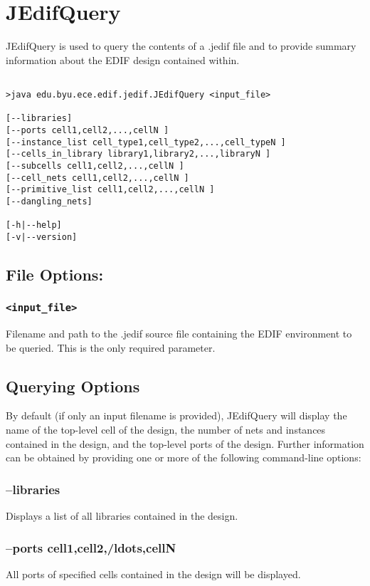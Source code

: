 \section{JEdifQuery}
JEdifQuery is used to query the contents of a .jedif file and to
provide summary information about the EDIF design contained within.
\begin{verbatim}

>java edu.byu.ece.edif.jedif.JEdifQuery <input_file>

[--libraries] 
[--ports cell1,cell2,...,cellN ] 
[--instance_list cell_type1,cell_type2,...,cell_typeN ]
[--cells_in_library library1,library2,...,libraryN ]
[--subcells cell1,cell2,...,cellN ] 
[--cell_nets cell1,cell2,...,cellN ]
[--primitive_list cell1,cell2,...,cellN ]
[--dangling_nets]

[-h|--help] 
[-v|--version]

\end{verbatim}

\subsection{File Options:}
\subsubsection{\texttt{<input\_file>}}
Filename and path to the .jedif source file containing the EDIF environment to be queried. This is the only required parameter.

\subsection{Querying Options}
  By default (if only an input filename is provided), JEdifQuery will
  display the name of the top-level cell of the design, the number of
  nets and instances contained in the design, and the top-level ports
  of the design. Further information can be obtained by providing one
  or more of the following command-line options:

  \subsubsection{--libraries}
     Displays a list of all libraries contained in the design.

  \subsubsection{--ports cell1,cell2,/ldots,cellN }
        All ports of specified cells contained in the design will be displayed.

